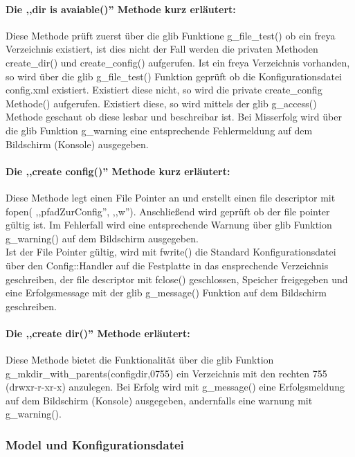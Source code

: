 \paragraph{Die ,,dir is avaiable()'' Methode kurz erläutert:}
Diese Methode prüft zuerst über die glib Funktione g\_file\_test() ob ein freya Verzeichnis existiert,
ist dies nicht der Fall werden die privaten Methoden create\_dir() und create\_config() aufgerufen.
Ist ein freya Verzeichnis vorhanden, so wird über die glib g\_file\_test() Funktion geprüft ob die Konfigurationsdatei
config.xml existiert. Existiert diese nicht, so wird die private create\_config Methode() aufgerufen.
Existiert diese, so wird mittels der glib g\_access() Methode geschaut ob diese lesbar und beschreibar ist. 
Bei Misserfolg wird über die glib Funktion g\_warning eine entsprechende Fehlermeldung auf
dem Bildschirm (Konsole) ausgegeben.


\paragraph{Die ,,create config()'' Methode kurz erläutert:}
Diese Methode legt einen File Pointer an und erstellt einen file descriptor mit fopen( ,,pfadZurConfig'', ,,w'').
Anschließend wird geprüft ob der file pointer gültig ist.
Im Fehlerfall wird eine entsprechende Warnung über glib Funktion g\_warning() auf dem Bildschirm ausgegeben.
\\
Ist der File Pointer gültig, wird mit fwrite() die
Standard Konfigurationsdatei über den Config::Handler auf die Festplatte in das ensprechende Verzeichnis geschreiben,
der file descriptor mit fclose() geschlossen, Speicher freigegeben und eine Erfolgsmessage mit der glib g\_message()
Funktion auf dem Bildschirm geschreiben.

\paragraph{Die ,,create dir()'' Methode erläutert:}
Diese Methode bietet die Funktionalität über die glib Funktion g\_mkdir\_with\_parents(configdir,0755) ein Verzeichnis mit den rechten 755 (drwxr-r-xr-x) anzulegen. Bei Erfolg wird mit g\_message() eine Erfolgsmeldung auf dem Bildschirm (Konsole)
ausgegeben, andernfalls eine warnung mit g\_warning().



\subsubsection{Model und Konfigurationsdatei}


